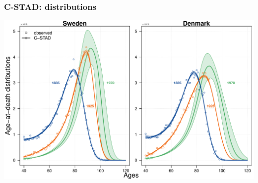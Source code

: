 \documentclass[12pt, xcolor=table]{beamer}  %
\begin{document}
\begin{frame}[noframenumbering]\frametitle{C-STAD: distributions}
	
	\vspace{-0.5cm}
	
	\begin{center}	
		\vspace{0.2cm}
		
		\includegraphics[scale=.42]{Figures/Ch4/F8}
		
	\end{center}
	
\end{frame}
\end{document}
